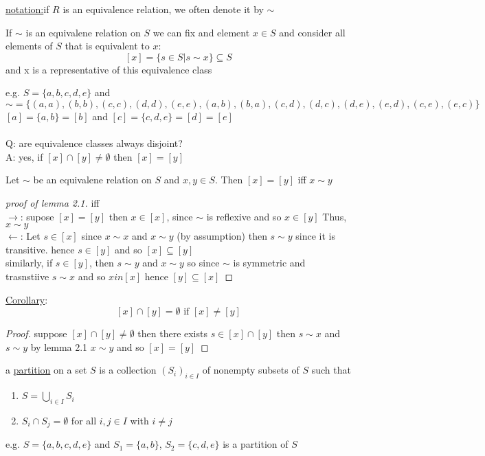 \documentclass{article}
\begin{document}
     \underline{notation:}if $R$ is an equivalence relation, we often denote it by $\sim$ 

    \begin{definition}
        If $\sim$ is an equivalene relation on $S$ we can fix and element $x \in S$ and consider all elements of $S$ that is equivalent to $x$: \\ 
        $$[x] = \{s \in S| s \sim x\} \subseteq S$$ 
        and x is a representative of this equivalence class
    \end{definition} 
    e.g. $S = \{a, b, c, d, e\}$ and $\sim = \{(a,a), (b,b), (c,c), (d,d), (e,e), (a,b), (b,a), (c,d), (d,c), (d,e), (e,d), (c,e), (e,c) \}$ \\
    $[a] = \{a,b\} = [b] $  and 
    $[c] = \{c,d,e\} = [d] = [e]$ \\  \\ 
    Q: are equivalence classes always disjoint? \\ 
    A: yes, if $[x] \cap [y] \neq \emptyset$ then $[x] = [y]$ \\
    \begin{lemma}
        Let $\sim$ be an equivalene relation on $S$ and $x,y \in S$. Then $[x] = [y]$ iff $x \sim y$
    \end{lemma}
    \begin{proof}[proof of lemma 2.1] 
        iff \\ 
        $\rightarrow$: supose $[x] = [y]$ then $x \in [x] $, since $\sim$ is reflexive and so $x \in [y]$ Thus, $x \sim y$
        \\ 
        $\leftarrow$: Let $s \in [x]$ since $x \sim x$ and $x \sim y$ (by assumption) then $s \sim y$ since it is transitive. hence $s \in [y]$ and so $[x] \subseteq [y]$
        \\ similarly, if $s \in [y]$, then $s \sim y$ and $x \sim y$ so since $\sim$ is symmetric and trasnstiive $s \sim x$ and so $x in [x]$ hence $[y] \subseteq [x]$
    \end{proof}

    \underline{Corollary}: $$[x] \cap [y] = \emptyset \text{ if } [x] \not = [y]$$
    \begin{proof}
        suppose $[x] \cap [y] \neq \emptyset$ then there exists $s \in [x] \cap [y]$ then $s \sim x$ and $s \sim y$ by lemma 2.1 $x \sim y$ and so $[x] = [y]$
    \end{proof}

    \begin{definition}
        a \underline{partition} on a set $S$ is a collection $(S_i)_{i \in I}$ of nonempty subsets of $S$ such that
        \begin{enumerate}
            \item $S = \bigcup_{i \in I} S_i$
            \item $S_i \cap S_j = \emptyset$ for all $i,j \in I$ with $i \not = j$
        \end{enumerate}
    \end{definition}
    e.g. $S = \{a,b,c,d,e\}$ and $S_1 = \{a,b\}$, $S_2 = \{c,d,e\}$ is a partition of $S$ \\
\end{document}
